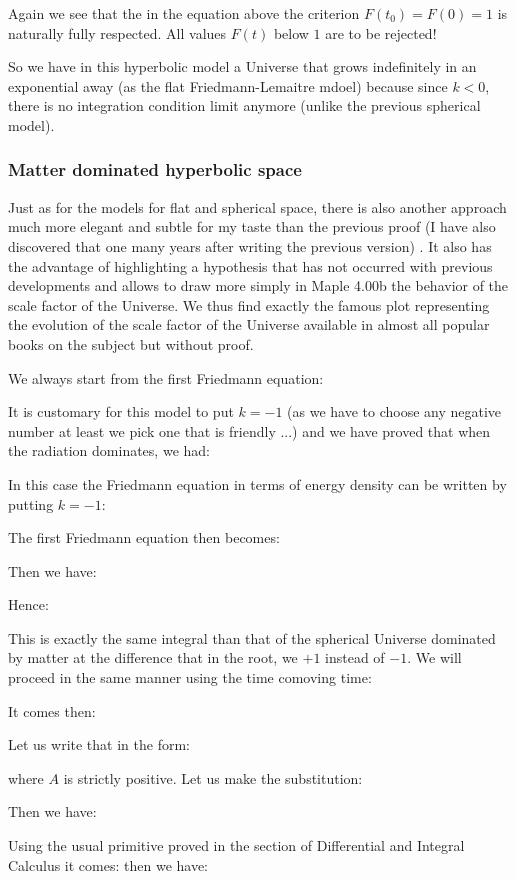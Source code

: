 	Again we see that the in the equation above the criterion $F(t_0)=F(0)=1$ is naturally fully respected. All values $F (t) $ below $1$ are to be rejected!

	So we have in this hyperbolic model a Universe that grows indefinitely in an exponential away (as the flat Friedmann-Lemaitre mdoel) because since $k<0$, there is no integration condition limit anymore (unlike the previous spherical model).
	
	\subsubsection{Matter dominated hyperbolic space}
	Just as for the models for flat and spherical space, there is also another approach much more elegant and subtle for my taste than the previous proof (I have also discovered that one many years after writing the previous version) . It also has the advantage of highlighting a hypothesis that has not occurred with previous developments and allows to draw more simply in Maple 4.00b the behavior of the scale factor of the Universe. We thus find exactly the famous plot representing the evolution of the scale factor of the Universe available in almost all popular books on the subject but without proof.

	We always start from the first Friedmann equation:
	
	It is customary for this model to put $k=-1$ (as we have to choose any negative number at least we pick one that is friendly ...) and we have proved that when the radiation dominates, we had:
	
	In this case the Friedmann equation in terms of energy density can be written by putting $k=-1$:
	
	The first Friedmann equation then becomes:
	
	Then we have:
	
	Hence:
	
	This is exactly the same integral than that of the spherical Universe dominated by matter at the difference that in the root, we $+1$ instead of $-1$. We will proceed in the same manner using the time comoving time:
	
	It comes then:
	
	Let us write that in the form:
	
	where $A$ is strictly positive. Let us make the substitution:
	
	Then we have:
	
	Using the usual primitive proved in the section of Differential and Integral Calculus it comes:
	then we have:
	
